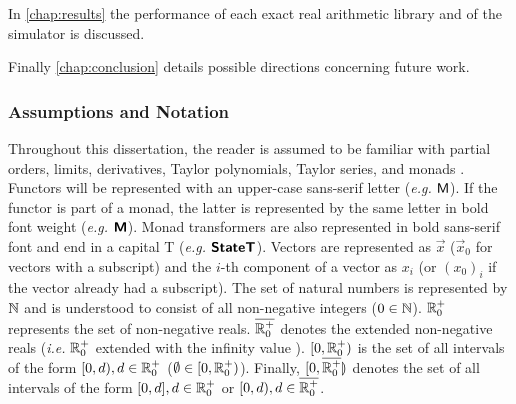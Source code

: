 In \cref{chap:results} the performance of each exact real arithmetic library and of the simulator is discussed.

Finally \cref{chap:conclusion} details possible directions concerning future work.

\subsubsection{Assumptions and Notation}

Throughout this dissertation, the reader is assumed to be familiar with partial orders, limits, derivatives, Taylor polynomials, Taylor series, and monads \cite{apostol1991calculus} \cite{moggi:1991}. Functors will be represented with an upper-case sans-serif letter (\textit{e.g.} $\textsf{M}$). If the functor is part of a monad, the latter is represented by the same letter in bold font weight (\textit{e.g.} $\textbf{\textsf{M}}$). Monad transformers are also represented in bold sans-serif font and end in a capital T (\textit{e.g.} $\textbf{\textsf{StateT}}$). Vectors are represented as $\vec{x}$ ($\vec{x}_0$ for vectors with a subscript) and the $i$-th component of a vector as $x_i$ (or $(x_0)_i$ if the vector already had a subscript). The set of natural numbers is represented by $\mathbb{N}$ and is understood to consist of all non-negative integers ($0 \in \mathbb{N}$). $\mathbb{R}_0^+$ represents the set of non-negative reals. $\overline{\mathbb{R}_0^+}$ denotes the extended non-negative reals (\textit{i.e.} $\mathbb{R}_0^+$ extended with the infinity value \infty). $[0,\mathbb{R}_0^+)$ is the set of all intervals of the form $[0,d), d \in \mathbb{R}_0^+$ ($\emptyset \in [0,\mathbb{R}_0^+)$). Finally, $[0,\overline{\mathbb{R}_0^+}\rrparenthesis$ denotes the set of all intervals of the form $[0,d], d \in \mathbb{R}_0^+$ or $[0,d), d \in \overline{\mathbb{R}_0^+}$.
